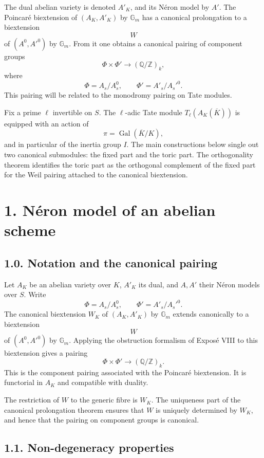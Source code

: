 \documentclass[11pt]{article}
\theoremstyle{plain}
\theoremstyle{definition}
\theoremstyle{remark}
\newcommand{\bQ}{\mathbb Q}
\newcommand{\bZ}{\mathbb Z}
\newcommand{\Gm}{\mathbb G_m}
\begin{document}
The dual abelian variety is denoted \(A'_K\), and its Néron model by \(A'\).
The Poincaré biextension of \((A_K,A'_K)\) by \(\Gm\) has a canonical
prolongation to a biextension
\[
W
\]
of \((A^0,A'^0)\) by \(\Gm\). From it one obtains a canonical pairing of
component groups
\[
\Phi\times\Phi'\longrightarrow (\bQ/\bZ)_k,
\]
where
\[
\Phi=A_s/A_s^0,\qquad \Phi'=A'_s/A_s'^0.
\]
This pairing will be related to the monodromy pairing on Tate modules.

Fix a prime \(\ell\) invertible on \(S\). The \(\ell\)-adic Tate module
\(T_\ell(A_K(\overline K))\) is equipped with an action of
\[
\pi=\operatorname{Gal}(\overline K/K),
\]
and in particular of the inertia group \(I\). The main constructions below
single out two canonical submodules: the fixed part and the toric part. The
orthogonality theorem identifies the toric part as the orthogonal complement of
the fixed part for the Weil pairing attached to the canonical biextension.

\section*{1. Néron model of an abelian scheme}

\subsection*{1.0. Notation and the canonical pairing}

Let \(A_K\) be an abelian variety over \(K\), \(A'_K\) its dual, and \(A,A'\)
their Néron models over \(S\). Write
\[
\Phi=A_s/A_s^0,\qquad \Phi'=A'_s/A_s'^0.
\]
The canonical biextension \(W_K\) of \((A_K,A'_K)\) by \(\Gm\) extends
canonically to a biextension
\[
W
\]
of \((A^0,A'^0)\) by \(\Gm\). Applying the obstruction formalism of Exposé VIII
to this biextension gives a pairing
\[
\Phi\times\Phi'\longrightarrow(\bQ/\bZ)_k.
\]
This is the component pairing associated with the Poincaré biextension. It is
functorial in \(A_K\) and compatible with duality.

The restriction of \(W\) to the generic fibre is \(W_K\). The uniqueness part of
the canonical prolongation theorem ensures that \(W\) is uniquely determined by
\(W_K\), and hence that the pairing on component groups is canonical.

\subsection*{1.1. Non-degeneracy properties}
\end{document}
